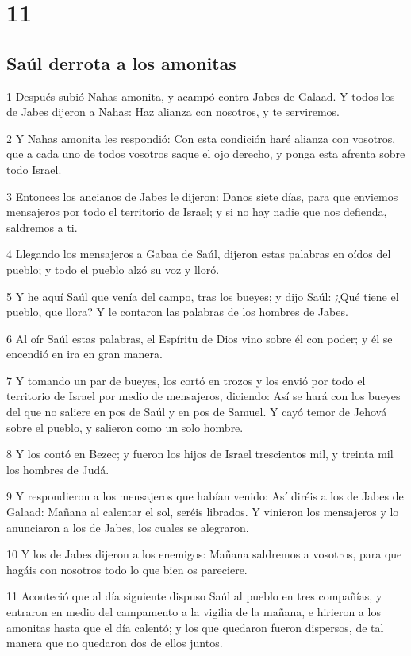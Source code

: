 \chapter{11}

\section*{Saúl derrota a los amonitas}

\par 1 Después subió Nahas amonita, y acampó contra Jabes de Galaad. Y todos los de Jabes dijeron a Nahas: Haz alianza con nosotros, y te serviremos.
\par 2 Y Nahas amonita les respondió: Con esta condición haré alianza con vosotros, que a cada uno de todos vosotros saque el ojo derecho, y ponga esta afrenta sobre todo Israel.
\par 3 Entonces los ancianos de Jabes le dijeron: Danos siete días, para que enviemos mensajeros por todo el territorio de Israel; y si no hay nadie que nos defienda, saldremos a ti.
\par 4 Llegando los mensajeros a Gabaa de Saúl, dijeron estas palabras en oídos del pueblo; y todo el pueblo alzó su voz y lloró.
\par 5 Y he aquí Saúl que venía del campo, tras los bueyes; y dijo Saúl: ¿Qué tiene el pueblo, que llora? Y le contaron las palabras de los hombres de Jabes.
\par 6 Al oír Saúl estas palabras, el Espíritu de Dios vino sobre él con poder; y él se encendió en ira en gran manera.
\par 7 Y tomando un par de bueyes, los cortó en trozos y los envió por todo el territorio de Israel por medio de mensajeros, diciendo: Así se hará con los bueyes del que no saliere en pos de Saúl y en pos de Samuel. Y cayó temor de Jehová sobre el pueblo, y salieron como un solo hombre.
\par 8 Y los contó en Bezec; y fueron los hijos de Israel trescientos mil, y treinta mil los hombres de Judá.
\par 9 Y respondieron a los mensajeros que habían venido: Así diréis a los de Jabes de Galaad: Mañana al calentar el sol, seréis librados. Y vinieron los mensajeros y lo anunciaron a los de Jabes, los cuales se alegraron.
\par 10 Y los de Jabes dijeron a los enemigos: Mañana saldremos a vosotros, para que hagáis con nosotros todo lo que bien os pareciere.
\par 11 Aconteció que al día siguiente dispuso Saúl al pueblo en tres compañías, y entraron en medio del campamento a la vigilia de la mañana, e hirieron a los amonitas hasta que el día calentó; y los que quedaron fueron dispersos, de tal manera que no quedaron dos de ellos juntos.
